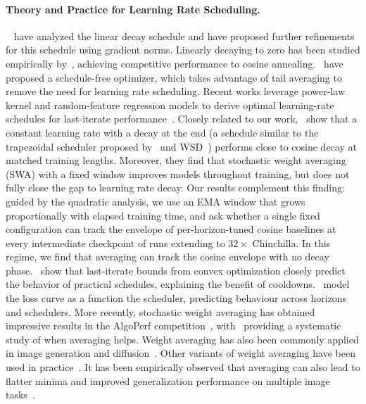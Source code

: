 \documentclass{article}
\theoremstyle{plain}
\begin{document}
\paragraph{Theory and Practice for Learning Rate Scheduling.}~\citet{defazio2023optimal} have analyzed the linear decay schedule and have proposed further refinements for this schedule using gradient norms. Linearly decaying to zero has been studied empirically by~\citet{bergsma2025straight}, achieving competitive performance to cosine annealing.~\citet{defazio2024road} have proposed a schedule-free optimizer, which takes advantage of tail averaging to remove the need for learning rate scheduling. Recent works leverage power-law kernel and random-feature regression models to derive optimal learning-rate schedules for last-iterate
performance~\citep{li2026optimal,bordelon2026theory}.
Closely related to our work,~\citet{hagele2024scaling} show that a constant learning rate with a decay at the end (a schedule similar to the trapezoidal scheduler proposed by~\citet{zhai2022scaling} and WSD~\citep{hu2024minicpm}) performs close to cosine decay at matched training lengths. Moreover, they find that stochastic weight averaging (SWA) with a fixed window improves models throughout training, but does not fully close the gap to learning rate decay. Our results complement this finding: guided by the quadratic analysis, we use an EMA window that grows proportionally with elapsed training time, and ask whether a single fixed configuration can track the envelope of per-horizon-tuned cosine baselines at every intermediate checkpoint of runs extending to $32\times$ Chinchilla. In this regime, we find that averaging can track the cosine envelope with no decay phase.~\citet{schaipp2025surprising} show that last-iterate bounds from convex optimization closely predict the behavior of practical schedules, explaining the benefit of cooldowns.~\citet{tissue2026scaling,luo2025multi,li2026functional} model the loss curve as a function the scheduler, predicting behaviour across horizons and schedulers. More recently, stochastic weight averaging has obtained impressive results in the AlgoPerf competition~\citep{kasimbeg2025accelerating, dahl2023benchmarking}, with~\citet{ajroldi2025and} providing a systematic study of when averaging helps. Weight averaging has also been commonly applied in image generation and diffusion~\citep{yazici2018unusual, karras2024analyzing,song2020score}. Other variants of weight averaging have been used in practice~\citep{kaddour2022stop,sanyal2023early,li2024switch,morales2024exponential,arpit2022ensemble, wortsman2022model}. 
It has been empirically observed that averaging can also lead to flatter minima and improved generalization performance on multiple image tasks~\citep{izmailov2018averaging}. 
\end{document}
